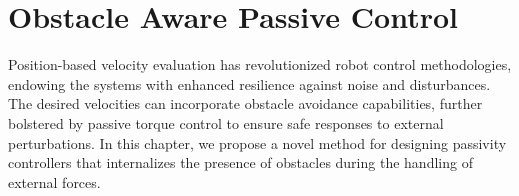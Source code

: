 % 
% 
% 
% 
% 
% 
% 
% 
% 
% 
% 
% 
% 
% 

 
\chapter{Obstacle Aware Passive Control} \label{chap:passivity_aware_damping}
% 
% 
Position-based velocity evaluation has revolutionized robot control methodologies, endowing the systems with enhanced resilience against noise and disturbances. The desired velocities can incorporate obstacle avoidance capabilities, further bolstered by passive torque control to ensure safe responses to external perturbations. 
In this chapter, we propose a novel method for designing passivity controllers that internalizes the presence of obstacles during the handling of external forces.

